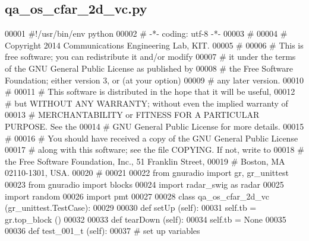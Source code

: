 \subsection{qa\+\_\+os\+\_\+cfar\+\_\+2d\+\_\+vc.\+py}
\label{qa__os__cfar__2d__vc_8py_source}

\begin{DoxyCode}
00001 \textcolor{comment}{#!/usr/bin/env python}
00002 \textcolor{comment}{# -*- coding: utf-8 -*-}
00003 \textcolor{comment}{# }
00004 \textcolor{comment}{# Copyright 2014 Communications Engineering Lab, KIT.}
00005 \textcolor{comment}{# }
00006 \textcolor{comment}{# This is free software; you can redistribute it and/or modify}
00007 \textcolor{comment}{# it under the terms of the GNU General Public License as published by}
00008 \textcolor{comment}{# the Free Software Foundation; either version 3, or (at your option)}
00009 \textcolor{comment}{# any later version.}
00010 \textcolor{comment}{# }
00011 \textcolor{comment}{# This software is distributed in the hope that it will be useful,}
00012 \textcolor{comment}{# but WITHOUT ANY WARRANTY; without even the implied warranty of}
00013 \textcolor{comment}{# MERCHANTABILITY or FITNESS FOR A PARTICULAR PURPOSE.  See the}
00014 \textcolor{comment}{# GNU General Public License for more details.}
00015 \textcolor{comment}{# }
00016 \textcolor{comment}{# You should have received a copy of the GNU General Public License}
00017 \textcolor{comment}{# along with this software; see the file COPYING.  If not, write to}
00018 \textcolor{comment}{# the Free Software Foundation, Inc., 51 Franklin Street,}
00019 \textcolor{comment}{# Boston, MA 02110-1301, USA.}
00020 \textcolor{comment}{# }
00021 
00022 \textcolor{keyword}{from} gnuradio \textcolor{keyword}{import} gr, gr\_unittest
00023 \textcolor{keyword}{from} gnuradio \textcolor{keyword}{import} blocks
00024 \textcolor{keyword}{import} radar\_swig \textcolor{keyword}{as} radar
00025 \textcolor{keyword}{import} random
00026 \textcolor{keyword}{import} pmt
00027 
00028 \textcolor{keyword}{class }qa_os_cfar_2d_vc (gr\_unittest.TestCase):
00029 
00030     \textcolor{keyword}{def }setUp (self):
00031         self.tb = gr.top\_block ()
00032 
00033     \textcolor{keyword}{def }tearDown (self):
00034         self.tb = \textcolor{keywordtype}{None}
00035 
00036     \textcolor{keyword}{def }test_001_t (self):
00037         \textcolor{comment}{# set up variables}

\end{DoxyCode}
